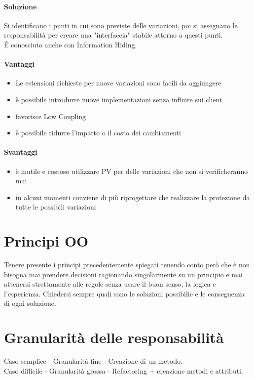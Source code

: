 \paragraph*{Soluzione} Si identificano i punti in cui sono previste delle variazioni, poi si assegnano
le responsabilità per creare una "interfaccia" stabile attorno a questi punti.
\\ \'E conosciuto anche con Information Hiding.
\paragraph*{Vantaggi}
\begin{itemize}
    \item Le estensioni richieste per nuove variazioni sono facili da aggiungere
    \item è possibile introdurre nuove implementazioni senza influire sui client
    \item favorisce Low Coupling
    \item è possibile ridurre l'impatto o il costo dei cambiamenti
\end{itemize}
\paragraph*{Svantaggi}
\begin{itemize}
    \item è inutile e costoso utilizzare PV per delle variazioni che non si verificheranno mai
    \item in alcuni momenti conviene di più riprogettare che realizzare la protezione da tutte le
    possibili variazioni
\end{itemize}
\section{Principi OO}
Tenere presente i principi precedentemente spiegati tenendo conto però che è non bisogna mai prendere
decisioni ragionando singolarmente su un principio e mai attenersi strettamente alle regole senza usare
il buon senso, la logica e l'esperienza. Chiedersi sempre quali sono le soluzioni possibilie e
le conseguenza di ogni soluzione.
\section{Granularità delle responsabilità}
Caso semplice - Granularità fine - Creazione di un metodo.
\\ Caso difficile - Granularità grossa - Refactoring + creazione metodi e attributi.
